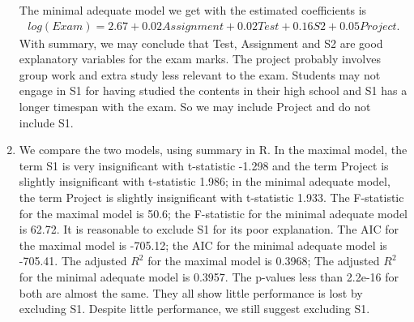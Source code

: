 \documentclass[10pt]{article}
\begin{document}
\begin{enumerate}[1)]
The minimal adequate model we get with the estimated coefficients is
\begin{align*}
log(Exam)=2.67+0.02Assignment+0.02Test+0.16S2+0.05Project.
\end{align*}
With {\ttfamily summary}, we may conclude that {\ttfamily Test}, {\ttfamily Assignment} and {\ttfamily S2} are good explanatory variables for the exam marks. The project probably involves group work and extra study less relevant to the exam. Students may not engage in {\ttfamily S1} for having studied the contents in their high school and {\ttfamily S1} has a longer timespan with the exam. So we may include {\ttfamily Project} and do not include {\ttfamily S1}.\\


\item
We compare the two models, using {\ttfamily summary} in R. In the maximal model, the term {\ttfamily S1} is very insignificant with t-statistic -1.298 and the term {\ttfamily Project} is slightly insignificant with t-statistic 1.986; in the minimal adequate model, the term {\ttfamily Project} is slightly insignificant with t-statistic 1.933. The F-statistic for the maximal model is 50.6; the F-statistic for the minimal adequate model is 62.72. It is reasonable to exclude {\ttfamily S1} for its poor explanation. The AIC for the maximal model is -705.12; the AIC for the minimal adequate model is -705.41. The adjusted $R^2$ for the maximal model is 0.3968; The adjusted $R^2$ for the minimal adequate model is 0.3957. The p-values less than 2.2e-16 for both are almost the same. They all show little performance is lost by excluding {\ttfamily S1}. Despite little performance, we still suggest excluding {\ttfamily S1}.\\


\end{enumerate}
\end{document}
